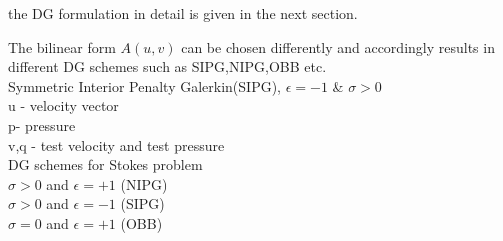 \documentclass[11pt,a4paper]{article}
\begin{document}
the DG formulation in detail is given in the next section.

\clearpage
{{The bilinear form $A(u,v)$ can be chosen differently and accordingly  results in different DG schemes such as SIPG,NIPG,OBB etc.}} \\
{Symmetric Interior Penalty Galerkin(SIPG), \quad$\epsilon = -1$ \& $\sigma > 0$}\\
u - velocity vector\\
p- pressure\\
v,q - test velocity and test pressure\\


DG schemes for Stokes problem\\

$\sigma > 0$ and $\epsilon = +1$ (NIPG)\\
$\sigma > 0$ and $\epsilon = -1$ (SIPG)\\
$\sigma = 0$ and $\epsilon = +1$ (OBB)\\
\end{document}

